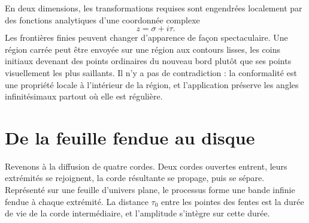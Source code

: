 \begin{classroomqa}\end{classroomqa}

En deux dimensions, les transformations requises sont engendrées localement par des fonctions analytiques d’une coordonnée complexe
\begin{equation}
  z=\sigma+i\tau.
\end{equation}
Les frontières finies peuvent changer d’apparence de façon spectaculaire. Une région carrée peut être envoyée sur une région aux contours lisses, les coins initiaux devenant des points ordinaires du nouveau bord plutôt que ses points visuellement les plus saillants. Il n’y a pas de contradiction : la conformalité est une propriété locale à l’intérieur de la région, et l’application préserve les angles infinitésimaux partout où elle est régulière.

\begin{classroomqa}\end{classroomqa}

\section{De la feuille fendue au disque}

Revenons à la diffusion de quatre cordes. Deux cordes ouvertes entrent, leurs extrémités se rejoignent, la corde résultante se propage, puis se sépare. Représenté sur une feuille d’univers plane, le processus forme une bande infinie fendue à chaque extrémité. La distance \(\tau_0\) entre les pointes des fentes est la durée de vie de la corde intermédiaire, et l’amplitude s’intègre sur cette durée.

